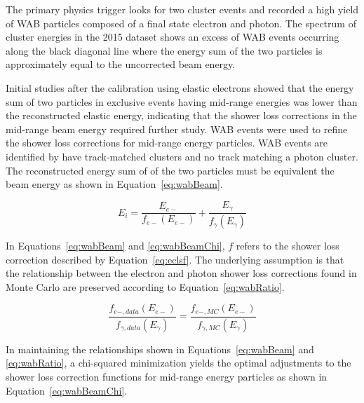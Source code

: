The primary physics trigger looks for two cluster events and recorded a high yield of WAB particles composed of a final state electron and photon. The spectrum of cluster energies in the 2015 dataset shows an excess of WAB events occurring along the black diagonal line where the energy sum of the two particles is approximately equal to the uncorrected beam energy.  


Initial studies after the calibration using elastic electrons showed that the energy sum of two particles in exclusive events having mid-range energies was lower than the reconstructed elastic energy, indicating that the shower loss corrections in the mid-range beam energy required further study. WAB events were used to refine the shower loss corrections for mid-range energy particles. WAB events are identified by have track-matched clusters and no track matching a photon cluster. The reconstructed energy sum of of the two particles must be equivalent the beam energy as shown in Equation~\eqref{eq:wabBeam}.

\begin{equation}
	\label{eq:wabBeam}
	E_i = \dfrac{E_{e-}}{f_{e-}(E_{e-})}+\dfrac{E_{\gamma}}{f_{\gamma}(E_{\gamma})}
\end{equation}

In Equations~\eqref{eq:wabBeam} and \eqref{eq:wabBeamChi}, $f$ refers to the shower loss correction described by Equation~\eqref{eq:eclsf}. The underlying assumption is that the relationship between the electron and photon shower loss corrections found in Monte Carlo are preserved according to Equation~\eqref{eq:wabRatio}.

\begin{equation}
	\label{eq:wabRatio}
	 \dfrac{f_{e-, data}(E_{e-})}{f_{\gamma, data}(E_{\gamma})}= \dfrac{f_{e-, MC}(E_{e-})}{f_{\gamma, MC}(E_{\gamma})}
\end{equation}

In maintaining the relationships shown in Equations~\eqref{eq:wabBeam} and \eqref{eq:wabRatio}, a chi-squared minimization yields the optimal adjustments to the shower loss correction functions for mid-range energy particles as shown in Equation~\eqref{eq:wabBeamChi}.

